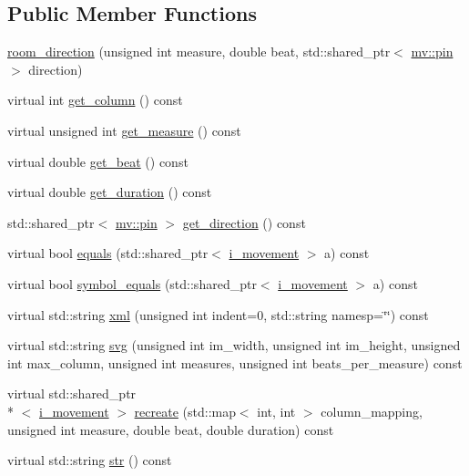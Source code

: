 \subsection*{Public Member Functions}
\begin{DoxyCompactItemize}
\item 
\hyperlink{classmae_1_1fl_1_1laban_1_1room__direction_af0df3de300b09be34d581a0a06256b1a}{room\-\_\-direction} (unsigned int measure, double beat, std\-::shared\-\_\-ptr$<$ \hyperlink{classmae_1_1fl_1_1laban_1_1mv_1_1pin}{mv\-::pin} $>$ direction)
\item 
virtual int \hyperlink{classmae_1_1fl_1_1laban_1_1room__direction_afa452f53f560485183e322571c9d1931}{get\-\_\-column} () const 
\item 
virtual unsigned int \hyperlink{classmae_1_1fl_1_1laban_1_1room__direction_aa7bf06d719e66f990debba5c1cc22f90}{get\-\_\-measure} () const 
\item 
virtual double \hyperlink{classmae_1_1fl_1_1laban_1_1room__direction_ad1b05ee39b84fc937170b2ef90af6f71}{get\-\_\-beat} () const 
\item 
virtual double \hyperlink{classmae_1_1fl_1_1laban_1_1room__direction_ae7cd8ee096a4cf46acfeba78a922c0cf}{get\-\_\-duration} () const 
\item 
std\-::shared\-\_\-ptr$<$ \hyperlink{classmae_1_1fl_1_1laban_1_1mv_1_1pin}{mv\-::pin} $>$ \hyperlink{classmae_1_1fl_1_1laban_1_1room__direction_a2a0ab5a17650a565c77c3f8f4ce70110}{get\-\_\-direction} () const 
\item 
virtual bool \hyperlink{classmae_1_1fl_1_1laban_1_1room__direction_a87704a471c16270f08a1b9f9ded7618d}{equals} (std\-::shared\-\_\-ptr$<$ \hyperlink{classmae_1_1fl_1_1laban_1_1i__movement}{i\-\_\-movement} $>$ a) const 
\item 
virtual bool \hyperlink{classmae_1_1fl_1_1laban_1_1room__direction_a0d3baa55c0408bc8c2386b2adfa53749}{symbol\-\_\-equals} (std\-::shared\-\_\-ptr$<$ \hyperlink{classmae_1_1fl_1_1laban_1_1i__movement}{i\-\_\-movement} $>$ a) const 
\item 
virtual std\-::string \hyperlink{classmae_1_1fl_1_1laban_1_1room__direction_a0d1a929061476676ca646dd5ff0d7ae8}{xml} (unsigned int indent=0, std\-::string namesp=\char`\"{}\char`\"{}) const 
\item 
virtual std\-::string \hyperlink{classmae_1_1fl_1_1laban_1_1room__direction_af7907869572c5927f02f49b3a7333b05}{svg} (unsigned int im\-\_\-width, unsigned int im\-\_\-height, unsigned int max\-\_\-column, unsigned int measures, unsigned int beats\-\_\-per\-\_\-measure) const 
\item 
virtual std\-::shared\-\_\-ptr\\*
$<$ \hyperlink{classmae_1_1fl_1_1laban_1_1i__movement}{i\-\_\-movement} $>$ \hyperlink{classmae_1_1fl_1_1laban_1_1room__direction_a776243cb6da19b5c0fe46c838c82002b}{recreate} (std\-::map$<$ int, int $>$ column\-\_\-mapping, unsigned int measure, double beat, double duration) const 
\item 
virtual std\-::string \hyperlink{classmae_1_1fl_1_1laban_1_1room__direction_ab8e8d61eb51db3da6a21cb2da455d307}{str} () const 
\end{DoxyCompactItemize}
